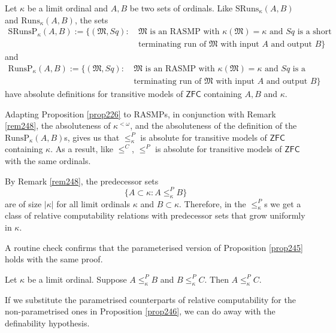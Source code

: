 \documentclass[12pt]{article}
\numberwithin{equation}{section}
\begin{document}
Let $\kappa$ be a limit ordinal and $A, B$ be two sets of ordinals. Like $\mathrm{SRuns}_{\kappa}(A, B)$ and $\mathrm{Runs}_{\kappa}(A, B)$, the sets
\begin{align*}
    \mathrm{SRunsP}_{\kappa}(A, B) := \{(\mathfrak{M}, Sq) : \ & \mathfrak{M} \text{ is an RASMP with } \kappa(\mathfrak{M}) = \kappa \text{ and } Sq \text{ is a short} \\
    & \text{terminating run of } \mathfrak{M} \text{ with input } A \text{ and output } B\}
\end{align*}
and
\begin{align*}
    \mathrm{RunsP}_{\kappa}(A, B) := \{(\mathfrak{M}, Sq) : \ & \mathfrak{M} \text{ is an RASMP with } \kappa(\mathfrak{M}) = \kappa \text{ and } Sq \text{ is a} \\
    & \text{terminating run of } \mathfrak{M} \text{ with input } A \text{ and output } B\}
\end{align*}
have absolute definitions for transitive models of $\mathsf{ZFC}$ containing $A, B$ and $\kappa$. 

Adapting Proposition \ref{prop226} to RASMPs, in conjunction with Remark \ref{rem248}, the absoluteness of $\kappa^{< \omega}$, and the absoluteness of the definition of the $\mathrm{RunsP}_{\kappa}(A, B)$s, gives us that $\leq^P_{\kappa}$ is absolute for transitive models of $\mathsf{ZFC}$ containing $\kappa$. As a result, like $\leq^C$, $\leq^P$ is absolute for transitive models of $\mathsf{ZFC}$ with the same ordinals. 

By Remark \ref{rem248}, the predecessor sets
\begin{equation*}
    \{A \subset \kappa : A \leq^P_{\kappa} B\}
\end{equation*}
are of size $|\kappa|$ for all limit ordinals $\kappa$ and $B \subset \kappa$. Therefore, in the $\leq^P_{\kappa}$s we get a class of relative computability relations with predecessor sets that grow uniformly in $\kappa$.

A routine check confirms that the parameterised version of Proposition \ref{prop245} holds with the same proof.

\begin{prop}\label{prop251}
Let $\kappa$ be a limit ordinal. Suppose $A \leq^P_{\kappa} B$ and $B \leq^P_{\kappa} C$. Then $A \leq^P_{\kappa} C$.
\end{prop}

If we substitute the parametrised counterparts of relative computability for the non-parametrised ones in Proposition \ref{prop246}, we can do away with the definability hypothesis.
\end{document}
